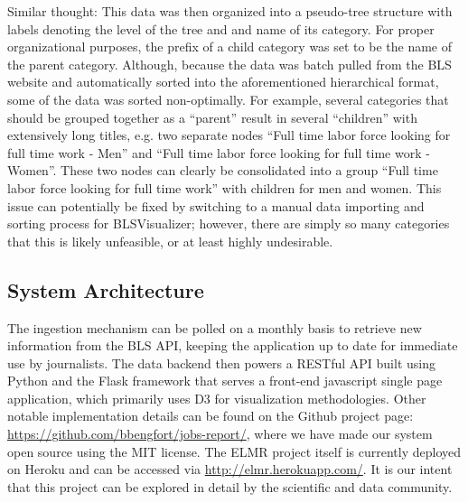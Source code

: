 \documentclass{sigchi}
\newcommand\Peter[1]{{\color{red}#1}}	%
\newcommand\Ben[1]{{\color{blue}#1}}	%
\begin{document}
Similar thought:
\Peter{This data was then organized into a pseudo-tree structure with labels denoting the level of the tree and and name of its category. For proper organizational purposes, the prefix of a child category was set to be the name of the parent category. Although, because the data was batch pulled from the BLS website and automatically sorted into the aforementioned hierarchical format, some of the data was sorted non-optimally. For example, several categories that should be grouped together as a ``parent'' result in several ``children'' with extensively long titles, e.g. two separate nodes ``Full time labor force looking for full time work - Men'' and ``Full time labor force looking for full time work - Women''. These two nodes can clearly be consolidated into a group ``Full time labor force looking for full time work'' with children for men and women. This issue can potentially be fixed by switching to a manual data importing and sorting process for BLSVisualizer; however, there are simply so many categories that this is likely unfeasible, or at least highly undesirable.  }

\subsection{System Architecture}

\Ben{The ingestion mechanism can be polled on a monthly basis to retrieve new information from the BLS API, keeping the application up to date for immediate use by journalists. The data backend then powers a RESTful API built using Python and the Flask framework that serves a front-end javascript single page application, which primarily uses D3 for visualization methodologies. Other notable implementation details can be found on the Github project page: \url{https://github.com/bbengfort/jobs-report/}, where we have made our system open source using the MIT license. The ELMR project itself is currently deployed on Heroku and can be accessed via \url{http://elmr.herokuapp.com/}. It is our intent that this project can be explored in detail by the scientific and data community.}
\end{document}
